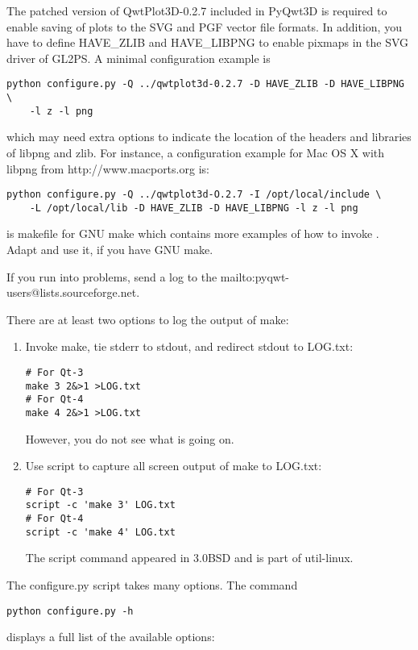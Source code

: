 \documentclass{manual}
\makeatletter
\newcommand{\mailinglist}{\ulink{mailing list}
  {mailto:pyqwt-users@lists.sourceforge.net}}
\newcommand{\MacPorts}{\ulink{MacPorts}
  {http://www.macports.org}}
\makeatother
\begin{document}
\begin{notice}[warning]
  The patched version of QwtPlot3D-0.2.7 included in PyQwt3D is required
  to enable saving of plots to the SVG and PGF vector file formats.
  In addition, you have to define HAVE_ZLIB and HAVE_LIBPNG to enable pixmaps
  in the SVG driver of GL2PS. A minimal configuration example is
\begin{verbatim}
python configure.py -Q ../qwtplot3d-0.2.7 -D HAVE_ZLIB -D HAVE_LIBPNG \
    -l z -l png
\end{verbatim}
  which may need extra options to indicate the location of the headers and
  libraries of libpng and zlib. For instance, a configuration example for
  Mac OS X with libpng from \MacPorts{} is:
\begin{verbatim}
python configure.py -Q ../qwtplot3d-O.2.7 -I /opt/local/include \
    -L /opt/local/lib -D HAVE_ZLIB -D HAVE_LIBPNG -l z -l png
\end{verbatim}
\end{notice}

\begin{notice}[note]
   is makefile for GNU make which contains more
  examples of how to invoke .
  Adapt and use it, if you have GNU make.
\end{notice}

\begin{notice}[note]
  If you run into problems, send a log to the \mailinglist{}.

  There are at least two options to log the output of make:
  \begin{enumerate}
  \item Invoke make, tie stderr to stdout, and redirect stdout to LOG.txt:
\begin{verbatim}
# For Qt-3
make 3 2&>1 >LOG.txt
# For Qt-4
make 4 2&>1 >LOG.txt
\end{verbatim}
    However, you do not see what is going on.
  \item Use script to capture all screen output of make to LOG.txt:
\begin{verbatim}
# For Qt-3
script -c 'make 3' LOG.txt
# For Qt-4
script -c 'make 4' LOG.txt
\end{verbatim}
    The script command appeared in 3.0BSD and is part of util-linux.
  \end{enumerate}
\end{notice}

\begin{notice}[note]
  The configure.py script takes many options. The command
\begin{verbatim}
python configure.py -h
\end{verbatim}
  displays a full list of the available options:
  
\end{notice}
\end{document}
